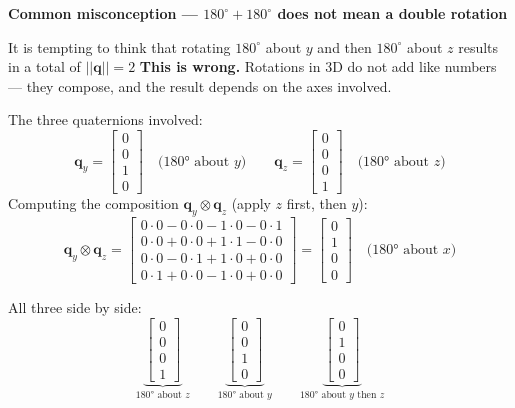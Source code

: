 \documentclass[12pt, a4paper]{article}
\begin{document}
\begin{warnbox}
  \textbf{Common misconception --- $180^\circ + 180^\circ$ does not mean
  a double rotation}

  It is tempting to think that rotating $180^\circ$ about $y$ and then
  $180^\circ$ about $z$ results in a total of \(||\mathbf{q}||=2\)
  \textbf{This is wrong.}
  Rotations in 3D do not add like numbers --- they compose, and the result
  depends on the axes involved.

  The three quaternions involved:
  \[
    \mathbf{q}_y
    = \begin{bmatrix}0\\0\\1\\0\end{bmatrix}
    \quad\text{(180° about }y\text{)}
    \qquad
    \mathbf{q}_z
    = \begin{bmatrix}0\\0\\0\\1\end{bmatrix}
    \quad\text{(180° about }z\text{)}
  \]
  Computing the composition $\mathbf{q}_y \otimes \mathbf{q}_z$
  (apply $z$ first, then $y$):
  \[
    \mathbf{q}_y \otimes \mathbf{q}_z
    =
    \begin{bmatrix}
      0{\cdot}0 - 0{\cdot}0 - 1{\cdot}0 - 0{\cdot}1 \\
      0{\cdot}0 + 0{\cdot}0 + 1{\cdot}1 - 0{\cdot}0 \\
      0{\cdot}0 - 0{\cdot}1 + 1{\cdot}0 + 0{\cdot}0 \\
      0{\cdot}1 + 0{\cdot}0 - 1{\cdot}0 + 0{\cdot}0
    \end{bmatrix}
    =
    \begin{bmatrix}0\\1\\0\\0\end{bmatrix}
    \quad\text{(180° about }x\text{)}
  \]

  All three side by side:
  \[
    \underbrace{\begin{bmatrix}0\\0\\0\\1\end{bmatrix}}_{\text{180° about }z}
    \qquad
    \underbrace{\begin{bmatrix}0\\0\\1\\0\end{bmatrix}}_{\text{180° about }y}
    \qquad
    \underbrace{\begin{bmatrix}0\\1\\0\\0\end{bmatrix}}_{\text{180° about }y\text{ then }z}
  \]


\end{warnbox}
\end{document}
